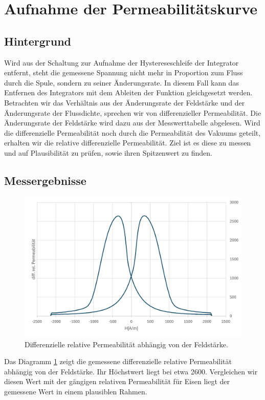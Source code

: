 \documentclass[a4paper,twoside,12pt,DIV=13,BCOR=5mm,numbers=noenddot,cleardoublepage=empty]{scrbook}
\begin{document}
        \section{Aufnahme der Permeabilit\"atskurve}
        \subsection{Hintergrund}
        Wird aus der Schaltung zur Aufnahme der Hystereseschleife der Integrator entfernt, steht die gemessene Spannung nicht mehr in Proportion 
        zum Fluss durch die Spule, sondern zu seiner \"Anderungsrate. In diesem Fall kann das Entfernen des Integrators mit dem Ableiten der Funktion
        gleichgesetzt werden. Betrachten wir das Verh\"altnis aus der \"Anderungsrate der Feldst\"arke und der \"Anderungsrate der Flussdichte, sprechen wir von 
        differenzieller Permeabilit\"at. Die \"Anderungsrate der Feldstärke wird dazu aus der Messwerttabelle abgelesen. Wird die differenzielle Permeabilit\"at noch durch die Permeabilit\"at des Vakuums geteilt, erhalten wir die relative differenzielle Permeabilit\"at. Ziel ist es diese zu messen 
        und auf Plausibilit\"at zu pr\"ufen, sowie ihren Spitzenwert zu finden.
        \subsection{Messergebnisse}
        \begin{figure}
          \centering
          \includegraphics[width=0.9\linewidth]{pictures/Permeabilitaet.png}
          \caption{Differenzielle relative Permeabilit\"at abh\"angig von der Feldst\"arke.}
          \label{fig:perm}
        \end{figure}
        Das Diagramm \ref{fig:perm} zeigt die gemessene differenzielle relative Permeabilit\"at abh\"angig von der Feldst\"arke. Ihr H\"ochstwert liegt bei etwa 2600. 
        Vergleichen wir diesen Wert mit der g\"angigen relativen Permeabilit\"at f\"ur Eisen liegt der gemessene Wert in einem plausiblen Rahmen.
        
\end{document}
